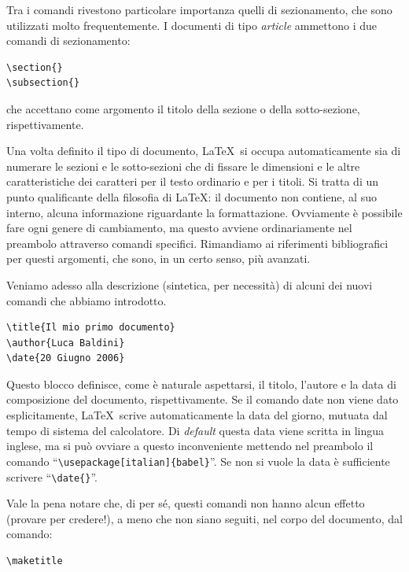 Tra i comandi rivestono particolare importanza quelli di sezionamento, che sono
utilizzati molto frequentemente. I documenti di tipo \emph{article} ammettono
i due comandi di sezionamento:
\begin{verbatim}
\section{}
\subsection{}
\end{verbatim}
che accettano come argomento il titolo della sezione o della sotto-sezione,
rispettivamente.

Una volta definito il tipo di documento, \LaTeX\ si occupa automaticamente sia
di numerare le sezioni e le sotto-sezioni che di fissare le dimensioni e
le altre caratteristiche dei caratteri per il testo ordinario e per i titoli.
Si tratta di un punto qualificante della filosofia di \LaTeX: il documento non
contiene, al suo interno, alcuna informazione riguardante la formattazione.
Ovviamente \`e possibile fare ogni genere di cambiamento, ma questo avviene
ordinariamente nel preambolo attraverso comandi specifici. Rimandiamo ai
riferimenti bibliografici per questi argomenti, che sono, in un certo senso,
pi\`u avanzati.

Veniamo adesso alla descrizione (sintetica, per necessit\`a) di alcuni dei
nuovi comandi che abbiamo introdotto.

\begin{verbatim}
\title{Il mio primo documento}
\author{Luca Baldini}
\date{20 Giugno 2006}
\end{verbatim}
Questo blocco definisce, come \`e naturale aspettarsi, il titolo, l'autore e
la data di composizione del documento, rispettivamente.
Se il comando date non viene dato esplicitamente, \LaTeX\ scrive
automaticamente la data del giorno, mutuata dal tempo di sistema del
calcolatore. Di \emph{default} questa data viene scritta in lingua inglese,
ma si pu\`o ovviare a questo inconveniente mettendo nel preambolo il comando
``\verb|\usepackage[italian]{babel}|''. Se non si vuole la data \`e
sufficiente scrivere ``\verb|\date{}|''.

Vale la pena notare che, di per s\'e,  questi comandi non hanno alcun effetto
(provare per credere!), a meno che non siano seguiti, nel corpo del documento,
dal comando:
\begin{verbatim}
\maketitle
\end{verbatim}

